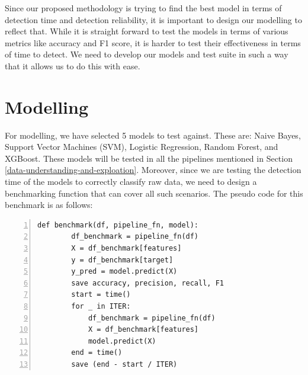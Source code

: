 Since our proposed methodology is trying to find the best model in terms of detection time and detection reliability, it is important to design our modelling to reflect that. While it is straight forward to test the models in terms of various metrics like accuracy and F1 score, it is harder to test their effectiveness in terms of time to detect. We need to develop our models and test suite in such a way that it allows us to do this with ease.




\section{Modelling}

For modelling, we have selected 5 models to test against. These are: Naive Bayes, Support Vector Machines (SVM), Logistic Regression, Random Forest, and XGBoost. These models will be tested in all the pipelines mentioned in Section \ref{data-understanding-and-exploation}. Moreover, since we are testing the detection time of the models to correctly classify raw data, we need to design a benchmarking function that can cover all such scenarios. The pseudo code for this benchmark is as follows:
\begin{lstlisting}[numbers=left,numbersep=-2em,frame=lines]
    def benchmark(df, pipeline_fn, model):
        df_benchmark = pipeline_fn(df)
        X = df_benchmark[features]
        y = df_benchmark[target]
        y_pred = model.predict(X)
        save accuracy, precision, recall, F1
        start = time()
        for _ in ITER:
            df_benchmark = pipeline_fn(df)
            X = df_benchmark[features]
            model.predict(X)
        end = time()
        save (end - start / ITER)
\end{lstlisting}

